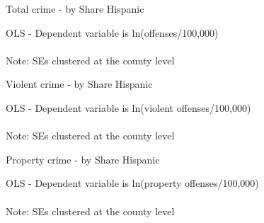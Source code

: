 \documentclass[xcolor=pdftex,dvipsnames,table]{beamer}
\newcommand{\tablesfolder}{/Users/bbiasi/Dropbox/Research/sanctuaries/sanctuaries_git/tex/tables}
\begin{document}
\begin{frame}{Total crime - by Share Hispanic}
\footnotesize
\begin{center}
OLS - Dependent variable is ln(offenses/100,000)\\

\\\footnotesize{Note: SEs clustered at the county level}
\end{center}
\end{frame}

\begin{frame}{Violent crime - by Share Hispanic}
\footnotesize
\begin{center}
OLS - Dependent variable is ln(violent offenses/100,000)\\

\\\footnotesize{Note: SEs clustered at the county level}
\end{center}
\end{frame}


\begin{frame}{Property crime - by Share Hispanic}
\footnotesize
\begin{center}
OLS - Dependent variable is ln(property offenses/100,000)\\

\\\footnotesize{Note: SEs clustered at the county level}
\end{center}
\end{frame}


\end{document}
